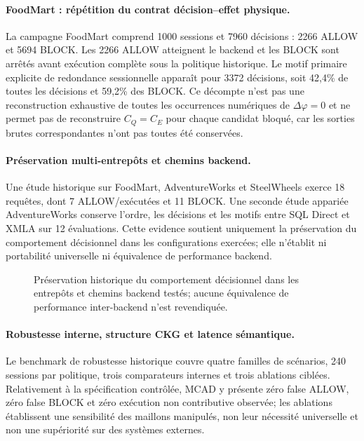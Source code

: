 \documentclass[journal]{IEEEtran}
\begin{document}
\paragraph{FoodMart : répétition du contrat décision--effet physique.}
La campagne FoodMart comprend 1000 sessions et 7960 décisions : 2266 ALLOW et 5694 BLOCK. Les 2266 ALLOW atteignent le backend et les BLOCK sont arrêtés avant exécution complète sous la politique historique. Le motif primaire explicite de redondance sessionnelle apparaît pour 3372 décisions, soit 42,4\% de toutes les décisions et 59,2\% des BLOCK. Ce décompte n'est pas une reconstruction exhaustive de toutes les occurrences numériques de $\Delta\varphi=0$ et ne permet pas de reconstruire $C_Q=C_E$ pour chaque candidat bloqué, car les sorties brutes correspondantes n'ont pas toutes été conservées.



\paragraph{Préservation multi-entrepôts et chemins backend.}
Une étude historique sur FoodMart, AdventureWorks et SteelWheels exerce 18 requêtes, dont 7 ALLOW/exécutées et 11 BLOCK. Une seconde étude appariée AdventureWorks conserve l'ordre, les décisions et les motifs entre SQL Direct et XMLA sur 12 évaluations. Cette evidence soutient uniquement la préservation du comportement décisionnel dans les configurations exercées; elle n'établit ni portabilité universelle ni équivalence de performance backend.

\begin{figure}[!t]
\centering
\begin{minipage}[t]{0.49\textwidth}\centering\end{minipage}\hfill
\begin{minipage}[t]{0.49\textwidth}\centering\end{minipage}
\caption{Préservation historique du comportement décisionnel dans les entrepôts et chemins backend testés; aucune équivalence de performance inter-backend n'est revendiquée.}
\label{fig:historical-multi-config}
\end{figure}

\paragraph{Robustesse interne, structure CKG et latence sémantique.}
Le benchmark de robustesse historique couvre quatre familles de scénarios, 240 sessions par politique, trois comparateurs internes et trois ablations ciblées. Relativement à la spécification contrôlée, MCAD y présente zéro false ALLOW, zéro false BLOCK et zéro exécution non contributive observée; les ablations établissent une sensibilité des maillons manipulés, non leur nécessité universelle et non une supériorité sur des systèmes externes.
\end{document}
